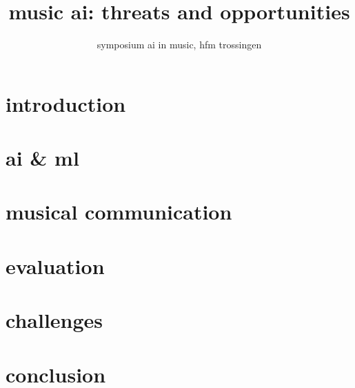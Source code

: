 
\usepackage{multirow}
\AtBeginBibliography{\tiny}

\title{music ai: threats and opportunities}
\subtitle{symposium ai in music, hfm trossingen} 


	

    \section[intro]{introduction}
        

    \section{ai \& ml}
        
        
    \section{musical communication}
        
        
    \section{evaluation}
        
    
    \section[current state]{challenges}
        
        
    \section{conclusion}
        
        
    


